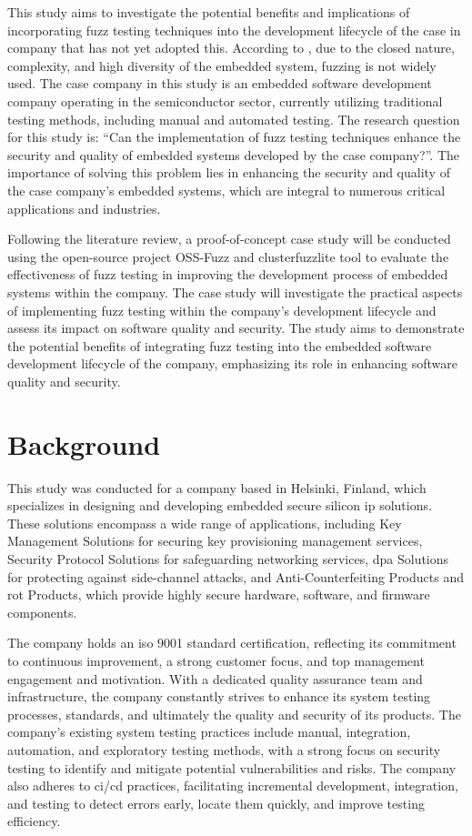 This study aims to investigate the potential benefits and implications of incorporating fuzz testing
techniques into the development lifecycle of the case in company that has not yet adopted this.
According to \citeauthor{9787842}, due to the closed nature, complexity, and high diversity of the
embedded system, fuzzing is not widely used\cite{9787842}. The case company in this study is an
embedded software development company operating in the semiconductor sector,
currently utilizing traditional testing methods, including manual and automated testing.
The research question for this study is: ``Can the implementation of fuzz testing techniques
enhance the security and quality of embedded systems developed by the case company?''.
 The importance of solving this problem lies in enhancing the security and quality of
 the case company's embedded systems, which are integral to numerous critical applications
 and industries.

Following the literature review, a proof-of-concept case study will be conducted using the
open-source project OSS-Fuzz\cite{GitHubgo49:online} and clusterfuzzlite\cite{ClusterF90:online} tool
to evaluate the effectiveness of fuzz testing in improving the development process of embedded systems
within the company. The case study will investigate the practical aspects of implementing
fuzz testing within the company's development lifecycle and assess its impact on software
quality and security. The study aims to demonstrate the potential benefits of integrating fuzz
testing into the embedded software development lifecycle of the company,
emphasizing its role in enhancing software quality and security.

\section{Background}
This study was conducted for a company based in Helsinki, Finland, which specializes in designing and
developing embedded secure silicon \acrlong{ip} solutions. These solutions encompass a wide range
of applications, including Key Management Solutions for securing key provisioning management
services, Security Protocol Solutions for safeguarding networking services, \acrlong{dpa} Solutions
for protecting against side-channel attacks, and Anti-Counterfeiting Products and \acrlong{rot} Products,
which provide highly secure hardware, software, and firmware components.

The company holds an \acrlong{iso} 9001 standard certification, reflecting its commitment to
continuous improvement, a strong customer focus, and top management engagement and motivation\cite{ISOISO9048:online}.
With a dedicated quality assurance team and infrastructure, the company constantly strives to
enhance its system testing processes, standards, and ultimately the quality and security of its products.
The company's existing system testing practices include manual, integration, automation, and exploratory
testing methods, with a strong focus on security testing to identify and mitigate potential
vulnerabilities and risks. The company also adheres to \acrlong{ci/cd} practices, facilitating
incremental development, integration, and testing to detect errors early, locate them quickly,
and improve testing efficiency.

